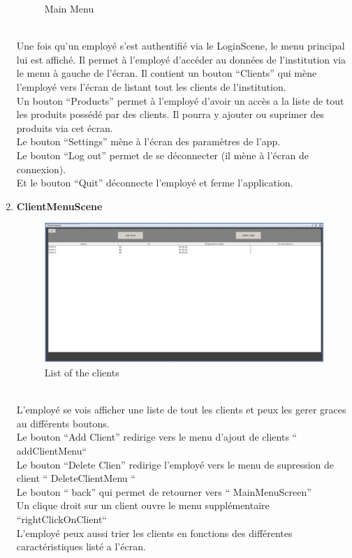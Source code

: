 \documentclass[../rapport.tex]{subfiles}
\begin{document}
\begin{enumerate}
\begin{figure}[h!]
				\caption{Main Menu}
		\end{figure}
		\\
Une fois qu'un employé s'est authentifié via le LoginScene, le menu principal lui est affiché. Il permet à l'employé d'accéder au données de l'institution via le menu à 
gauche de l'écran. Il contient un bouton ``Clients'' qui mène l'employé vers l'écran de listant tout les clients de l'institution.\\
Un bouton ``Products'' permet à l'employé d'avoir un accès a la liste de tout les produits possédé par des clients. Il pourra y ajouter ou suprimer des produits via cet écran.\\
Le bouton ``Settings'' mène à l'écran des paramètres de l'app.\\
Le bouton ``Log out'' permet de se déconnecter (il mène à l'écran de connexion).\\
Et le bouton ``Quit'' déconnecte l'employé et ferme l'application.
\newpage
\item \textbf{ClientMenuScene} \\
		\begin{figure}[h!]
				\centering \includegraphics[scale=0.2]{ressources/photos_diagrammes/app2/gui/Clients menu scene.jpg}
				\caption{List of the clients}
		\end{figure}
		\\
L'employé se vois afficher une liste de tout les clients et peux les gerer graces au différents boutons.\\
Le bouton ``Add Client'' redirige vers le menu d'ajout de clients `` addClientMenu``\\
Le bouton ``Delete Clien'' redirige l'employé vers  le menu de supression de client `` DeleteClientMenu ``\\
Le bouton `` back'' qui permet de retourner vers `` MainMenuScreen''\\
Un clique droit sur un client ouvre le menu supplémentaire ``rightClickOnClient``\\
L'employé peux aussi trier les clients en fonctions des différentes caractéristiques listé a l'écran.\\


\end{enumerate}
\end{document}
